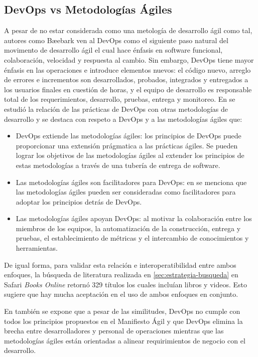 \subsection{DevOps vs Metodologías Ágiles} \label{sec:devops-vs-agile}
A pesar de no estar considerada como una metología de desarrollo ágil como tal, autores como Bæebark \cite{henrik-b} ven al DevOps como el siguiente paso natural del movimento de desarrollo ágil el cual hace énfasis en software funcional, colaboración, velocidad y respuesta al cambio. Sin embargo, DevOps tiene mayor énfasis en las operaciones e introduce elementos nuevos: el código nuevo, arreglo de errores e incrementos son desarrollados, probados, integrados y entregados a los usuarios finales en cuestión de horas, y el equipo de desarrollo es responsable total de los requerimientos, desarrollo, pruebas, entrega y monitoreo. En \cite{jabbari-et-al} se estudió la relación de las prácticas de DevOps con otras metodologías de desarrollo y se destaca con respeto a DevOps y a las metodologías ágiles que:
\begin{itemize}
    \item DevOps extiende las metodologías ágiles: los principios de DevOps puede proporcionar una extensión prágmatica a las prácticas ágiles. Se pueden lograr los objetivos de las metodologías ágiles al extender los principios de estas metodologías a través de una tubería de entrega de software.
    \item Las metodologías ágiles son facilitadores para DevOps: en \cite{jabbari-et-al} se menciona que las metodologías ágiles pueden ser consideradas como facilitadores para adoptar los principios detrás de DevOps.
    \item Las metodologías ágiles apoyan DevOps: al motivar la colaboración entre los miembros de los equipos, la automatización de la construcción, entrega y pruebas, el establecimiento de métricas y el intercambio de conocimientos y herramientas. 
\end{itemize}

De igual forma, para validar esta relación e interoperatibilidad entre ambos enfoques, la búsqueda de literatura realizada en \ref{sec:estrategia-busqueda} en Safari \emph{Books Online} retornó   329 títulos los cuales incluían libros y videos. Esto sugiere que hay mucha aceptación en el uso de ambos enfoques en conjunto.

En \cite{jabbari-et-al} también se expone que a pesar de las similitudes, DevOps no cumple con todos los principios propuestos en el Manifiesto Ágil \cite{agile-manifesto} y que DevOps elimina la brecha entre desarrolladores y personal de operaciones mientras que las metodologías ágiles están orientadas a alinear requirimientos de negocio con el desarrollo.

